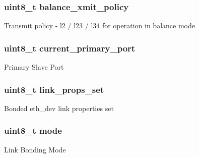 \subsubsection[{balance\+\_\+xmit\+\_\+policy}]{\setlength{\rightskip}{0pt plus 5cm}uint8\+\_\+t balance\+\_\+xmit\+\_\+policy}\label{structbond__dev__private_a39595da5d563085994b8584c3220571b}
Transmit policy -\/ l2 / l23 / l34 for operation in balance mode \hypertarget{structbond__dev__private_ad3dfc83b886db5b43a715eb7e50bd32e}{}
\subsubsection[{current\+\_\+primary\+\_\+port}]{\setlength{\rightskip}{0pt plus 5cm}uint8\+\_\+t current\+\_\+primary\+\_\+port}\label{structbond__dev__private_ad3dfc83b886db5b43a715eb7e50bd32e}
Primary Slave Port \hypertarget{structbond__dev__private_a8d6d530ad1e5e5d4a8f725e6fa44e751}{}
\subsubsection[{link\+\_\+props\+\_\+set}]{\setlength{\rightskip}{0pt plus 5cm}uint8\+\_\+t link\+\_\+props\+\_\+set}\label{structbond__dev__private_a8d6d530ad1e5e5d4a8f725e6fa44e751}
Bonded eth\+\_\+dev link properties set \hypertarget{structbond__dev__private_a37e90f5e3bd99fac2021fb3a326607d4}{}
\subsubsection[{mode}]{\setlength{\rightskip}{0pt plus 5cm}uint8\+\_\+t mode}\label{structbond__dev__private_a37e90f5e3bd99fac2021fb3a326607d4}
Link Bonding Mode \hypertarget{structbond__dev__private_ae6fa0630eafe59d603f1ed9123dcc7fe}{}
